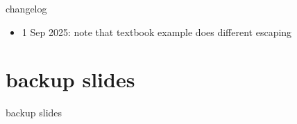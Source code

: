 \date{}
\title{}
\date{}

\begin{frame}
    \titlepage
\end{frame}

{\changelogmode
\begin{frame}{changelog}
\begin{itemize}
\item 1 Sep 2025: note that textbook example does different escaping
\end{itemize}
\end{frame}
}


\section{backup slides}
\begin{frame}{backup slides}
\end{frame}


